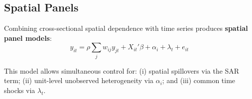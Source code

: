 \subsection{Spatial Panels}

Combining cross-sectional spatial dependence with time series produces
\textbf{spatial panel models}:
\begin{equation}
  y_{it} = \rho \sum_j w_{ij}y_{jt} + X_{it}'\beta + \alpha_i + \lambda_t + e_{it}
\end{equation}

This model allows simultaneous control for: (i) spatial spillovers via the
SAR term; (ii) unit-level unobserved heterogeneity via $\alpha_i$; and (iii)
common time shocks via $\lambda_t$.


\renewcommand\bibname{Further reading}
\begin{subappendices}


\end{subappendices}
